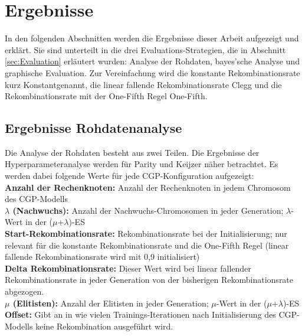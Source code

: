 \chapter{Ergebnisse}
\label{Ergebnisse}

In den folgenden Abschnitten werden die Ergebnisse dieser Arbeit aufgezeigt und erklärt.
Sie sind unterteilt in die drei Evaluations-Strategien, die in Abschnitt \ref{sec:Evaluation} erläutert wurden: Analyse der Rohdaten, bayes'sche Analyse und graphische Evaluation.
Zur Vereinfachung wird die konstante Rekombinationsrate kurz \glqq Konstant\grqq\space genannt, die linear fallende Rekombinationsrate \glqq Clegg \grqq\space und die Rekombinationsrate mit der One-Fifth Regel \glqq One-Fifth\grqq.

\section{Ergebnisse Rohdatenanalyse}
\label{sec:ergebnisseRohdaten}

Die Analyse der Rohdaten besteht aus zwei Teilen.
Die Ergebnisse der Hyperparameteranalyse werden für Parity und Keijzer näher betrachtet.
Es werden dabei folgende Werte für jede CGP-Konfiguration aufgezeigt:\\
\textbf{Anzahl der Rechenknoten:} Anzahl der Rechenknoten in jedem Chromosom des CGP-Modells\\
\textbf{$\lambda$ (Nachwuchs):} Anzahl der Nachwuchs-Chromosomen in jeder Generation; $\lambda$-Wert in der ($\mu$+$\lambda$)-ES\\
\textbf{Start-Rekombinationsrate:} Rekombinationsrate bei der Initialisierung; nur relevant für die konstante Rekombinationsrate und die One-Fifth Regel (linear fallende Rekombinationsrate wird mit 0,9 initialisiert)\\
\textbf{Delta Rekombinationsrate:} Dieser Wert wird bei linear fallender Rekombinationsrate in jeder Generation von der bisherigen Rekombinationsrate abgezogen.\\
\textbf{$\mu$ (Elitisten):} Anzahl der Elitisten in jeder Generation; $\mu$-Wert in der ($\mu$+$\lambda$)-ES\\
\textbf{Offset:} Gibt an in wie vielen Trainings-Iterationen nach Initialisierung des CGP-Modells keine Rekombination ausgeführt wird.\\

